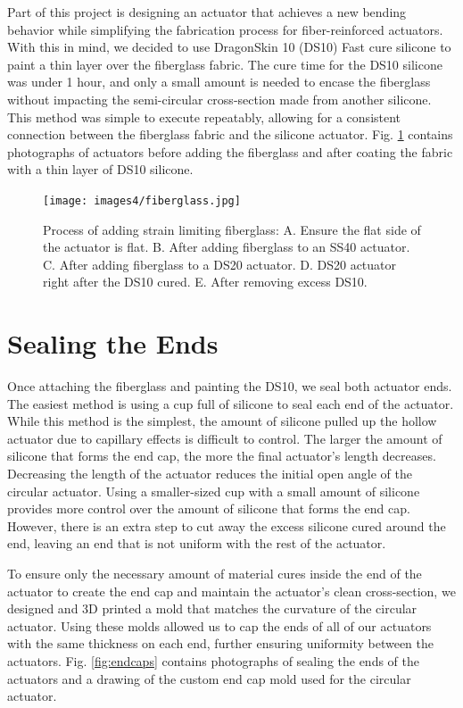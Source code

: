 Part of this project is designing an actuator that achieves a new bending behavior while simplifying the fabrication process for fiber-reinforced actuators. With this in mind, we decided to use DragonSkin 10 (DS10) Fast cure silicone to paint a thin layer over the fiberglass fabric. The cure time for the DS10 silicone was under 1 hour, and only a small amount is needed to encase the fiberglass without impacting the semi-circular cross-section made from another silicone. This method was simple to execute repeatably, allowing for a consistent connection between the fiberglass fabric and the silicone actuator. Fig. \ref{fig:fiberglass} contains photographs of actuators before adding the fiberglass and after coating the fabric with a thin layer of DS10 silicone. 

\begin{figure}[ht!]
    \centering
    \texttt{[image: images4/fiberglass.jpg]}
    \caption{Process of adding strain limiting fiberglass: A. Ensure the flat side of the actuator is flat. B. After adding fiberglass to an SS40 actuator. C. After adding fiberglass to a DS20 actuator. D. DS20 actuator right after the DS10 cured. E. After removing excess DS10.}
    \label{fig:fiberglass}
\end{figure}

\clearpage
\section{Sealing the Ends}
Once attaching the fiberglass and painting the DS10, we seal both actuator ends. The easiest method is using a cup full of silicone to seal each end of the actuator. While this method is the simplest, the amount of silicone pulled up the hollow actuator due to capillary effects is difficult to control. The larger the amount of silicone that forms the end cap, the more the final actuator's length decreases. Decreasing the length of the actuator reduces the initial open angle of the circular actuator. Using a smaller-sized cup with a small amount of silicone provides more control over the amount of silicone that forms the end cap. However, there is an extra step to cut away the excess silicone cured around the end, leaving an end that is not uniform with the rest of the actuator. 

To ensure only the necessary amount of material cures inside the end of the actuator to create the end cap and maintain the actuator's clean cross-section, we designed and 3D printed a mold that matches the curvature of the circular actuator. Using these molds allowed us to cap the ends of all of our actuators with the same thickness on each end, further ensuring uniformity between the actuators. Fig. \ref{fig:endcaps} contains photographs of sealing the ends of the actuators and a drawing of the custom end cap mold used for the circular actuator. 

